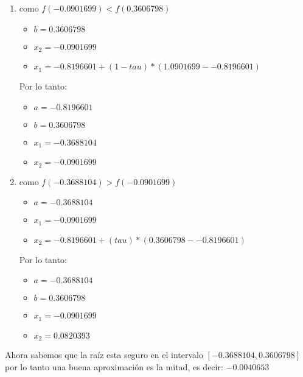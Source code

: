 \documentclass[12pt, fleqn]{article}                            %
\theoremstyle{break}                                            %
\begin{document}
\begin{enumerate}
            \clearpage

            \item como $f(-0.0901699) < f(0.3606798)$  
                \begin{itemize}
                    \item $b = 0.3606798$
                    \item $x_2 = -0.0901699$
                    \item $x_1 = -0.8196601 + (1 -tau) * (1.0901699 - -0.8196601)$   
                \end{itemize}

                Por lo tanto:
                \begin{itemize}
                    \item $a = -0.8196601$   
                    \item $b = 0.3606798$ 
                    \item $x_1 = -0.3688104$   
                    \item $x_2 = -0.0901699$
                \end{itemize}
        
            \item como $f(-0.3688104) > f(-0.0901699)$
                \begin{itemize}
                    \item $a = -0.3688104$
                    \item $x_1 = -0.0901699$
                    \item $x_2 = -0.8196601+ (tau) * (0.3606798 - -0.8196601)$
                \end{itemize}

                Por lo tanto:
                \begin{itemize}
                    \item $a = -0.3688104$
                    \item $b = 0.3606798$
                    \item $x_1 = -0.0901699$
                    \item $x_2 = 0.0820393$
                \end{itemize}
        
        \end{enumerate}


        Ahora sabemos que la raíz esta seguro en el intervalo $[-0.3688104, 0.3606798]$ por lo tanto
        una buena aproximación es la mitad, es decir: $-0.0040653$
\end{document}
